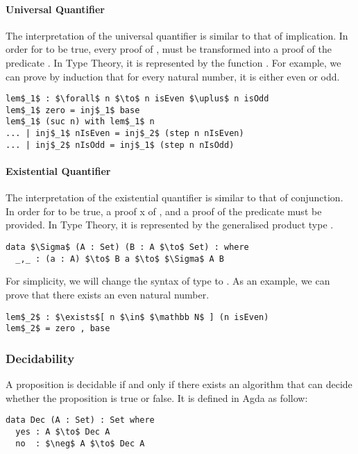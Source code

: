 \paragraph{Universal Quantifier} The interpretation of the universal
quantifier is similar to that of implication. In order for  to be true, every
proof  of , must be transformed into a proof of the predicate
. In Type Theory, it is represented by the function . For example, we can prove by induction that for every natural
number, it is either even or odd.
\begin{lstlisting}[mathescape=true,xleftmargin=.3\textwidth]
lem$_1$ : $\forall$ n $\to$ n isEven $\uplus$ n isOdd
lem$_1$ zero = inj$_1$ base
lem$_1$ (suc n) with lem$_1$ n
... | inj$_1$ nIsEven = inj$_2$ (step n nIsEven)
... | inj$_2$ nIsOdd = inj$_1$ (step n nIsOdd)
\end{lstlisting} 

\paragraph{Existential Quantifier} The interpretation of the
existential quantifier is similar to that of conjunction. In order for
 to be true, a proof x of , and a proof of the predicate
 must be provided. In Type Theory, it is represented by the generalised
product type \mb{\Sigma}. 
\begin{lstlisting}[mathescape=true,xleftmargin=.3\textwidth]
data $\Sigma$ (A : Set) (B : A $\to$ Set) : where
  _,_ : (a : A) $\to$ B a $\to$ $\Sigma$ A B
\end{lstlisting}

\par For simplicity, we will change the syntax of \mb{\Sigma} type to
. As an example, we can prove that
there exists an even natural number. 
\begin{lstlisting}[mathescape=true,xleftmargin=.3\textwidth]
lem$_2$ : $\exists$[ n $\in$ $\mathbb N$ ] (n isEven)
lem$_2$ = zero , base
\end{lstlisting}


\subsubsection{Decidability} 
\par A proposition is decidable if and only if there
exists an algorithm that can decide whether the proposition is true or false. It is
defined in Agda as follow: 
\begin{lstlisting}[mathescape=true,xleftmargin=.3\textwidth]
data Dec (A : Set) : Set where
  yes : A $\to$ Dec A
  no  : $\neg$ A $\to$ Dec A
\end{lstlisting}

